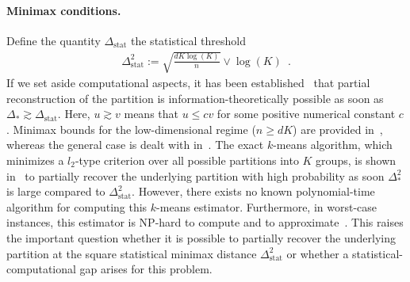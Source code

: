 \documentclass{article}
\newcommand{\alex}[1]{\textcolor{magenta}{[alex: #1]}}
\begin{document}
\paragraph{Minimax conditions.}
Define the quantity  $\Delta_{\mathrm{stat}}$ the statistical threshold
\begin{align}\label{eq:separation:minimax}
\Delta_{\mathrm{stat}}^2 := \sqrt{\frac{dK\log(K)}{n}} \lor  \log(K)\enspace .
\end{align}
If we set aside computational aspects, it has been established~\cite{Regev2017,Kwon20,Even24} that partial reconstruction of the partition is information-theoretically possible as soon as $\Delta_*\gtrsim \Delta_{\mathrm{stat}}$. Here, $u\gtrsim v$ means that $u\leq c v$ for some positive numerical constant $c$. Minimax bounds  for the low-dimensional regime ($n\geq dK$) are provided in~\cite{Regev2017}, whereas the general case is dealt with in~\cite{Even24}. The exact $k$-means algorithm, which minimizes a $l_2$-type criterion over all possible partitions into $K$ groups, is shown in~\cite{Even24} to partially recover the underlying partition with high probability as soon $\Delta_*^2$ is large compared to $\Delta_{\mathrm{stat}}^2$. However, there exists no known polynomial-time algorithm for computing this $k$-means estimator. Furthermore, in worst-case instances, this estimator is NP-hard to compute and to approximate~\cite{awasthi2015hardness}. This raises the important question whether it is possible to partially recover the underlying partition 
at the square statistical minimax distance $\Delta_{\mathrm{stat}}^2$ or whether a statistical-computational gap arises for this problem. 

\end{document}
